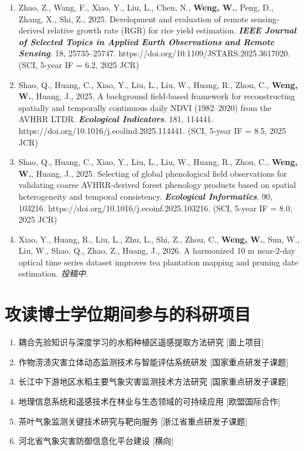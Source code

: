 \begin{enumerate}
    \item Zhao, Z., Wang, F., Xiao, Y., Liu, L., Chen, N., \textbf{Weng, W.}, Peng, D., Zhang, X., Shi, Z., 2025. Development and evaluation of remote sensing-derived relative growth rate (RGR) for rice yield estimation. \textit{\textbf{IEEE Journal of Selected Topics in Applied Earth Observations and Remote Sensing}}. 18, 25735--25747. https://doi.org/10.1109/JSTARS.2025.3617020. (SCI, 5-year IF = 6.2, 2025 JCR)
    
    \item Shao, Q., Huang, C., Xiao, Y., Liu, L., Liu, W., Huang, R., Zhou, C., \textbf{Weng, W.}, Huang, J., 2025. A background field-based framework for reconstructing spatially and temporally continuous daily NDVI (1982--2020) from the AVHRR LTDR. \textit{\textbf{Ecological Indicators}}. 181, 114441. https://doi.org/10.1016/j.ecolind.2025.114441. (SCI, 5-year IF = 8.5, 2025 JCR)
    
    \item Shao, Q., Huang, C., Xiao, Y., Liu, L., Liu, W., Huang, R., Zhou, C., \textbf{Weng, W.}, Huang, J., 2025. Selecting of global phenological field observations for validating coarse AVHRR-derived forest phenology products based on spatial heterogeneity and temporal consistency. \textit{\textbf{Ecological Informatics}}. 90, 103216. https://doi.org/10.1016/j.ecoinf.2025.103216. (SCI, 5-year IF = 8.0, 2025 JCR)
    
    \item Xiao, Y., Huang, R., Liu, L., Zhu, L., Shi, Z., Zhou, C., \textbf{Weng, W.}, Sun, W., Liu, W., Shao, Q., Zhao, Z., Huang, J., 2026. A harmonized 10 m near-2-day optical time series dataset improves tea plantation mapping and pruning date estimation. \textit{投稿中}.
\end{enumerate}


\section*{攻读博士学位期间参与的科研项目}

\begin{enumerate}
    \item 耦合先验知识与深度学习的水稻种植区遥感提取方法研究 [面上项目]
    \item 作物涝渍灾害立体动态监测技术与智能评估系统研发 [国家重点研发子课题]
    \item 长江中下游地区水稻主要气象灾害监测技术方法研究 [国家重点研发子课题]
    \item 地理信息系统和遥感技术在林业与生态领域的可持续应用 [欧盟国际合作]
    \item 茶叶气象监测关键技术研究与靶向服务 [浙江省重点研发子课题]
    \item 河北省气象灾害防御信息化平台建设 [横向]
\end{enumerate}
